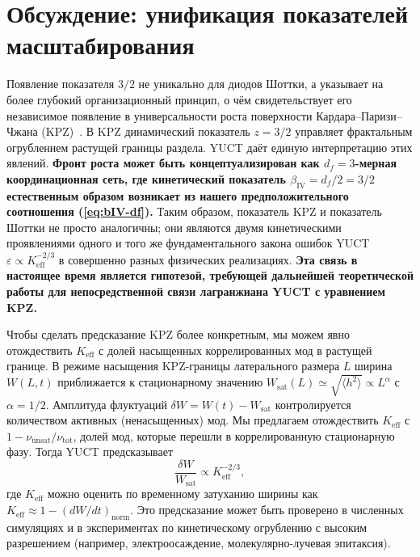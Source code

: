 \documentclass[12pt,a4paper]{article}
\newcommand{\Keff}{K_{\mathrm{eff}}}
\begin{document}
	\section{Обсуждение: унификация показателей масштабирования}
	
	Появление показателя $3/2$ не уникально для диодов Шоттки, а указывает на
	более глубокий организационный принцип, о чём свидетельствует его
	независимое появление в универсальности роста поверхности Кардара–Паризи–Чжана
	(KPZ)~\cite{KPZ}. В KPZ динамический показатель $z = 3/2$ управляет
	фрактальным огрублением растущей границы раздела. YUCT даёт единую
	интерпретацию этих явлений. \textbf{Фронт роста может быть концептуализирован
		как $d_f = 3$-мерная координационная сеть, где кинетический показатель
		$\beta_{\mathrm{IV}} = d_f/2 = 3/2$ естественным образом возникает из
		нашего предположительного соотношения (\ref{eq:bIV-df}).}
	Таким образом, показатель KPZ и показатель Шоттки не просто аналогичны;
	они являются двумя кинетическими проявлениями одного и того же
	фундаментального закона ошибок YUCT $\varepsilon \propto \Keff^{-2/3}$ в
	совершенно разных физических реализациях. \textbf{Эта связь в настоящее
		время является гипотезой, требующей дальнейшей теоретической работы для
		непосредственной связи лагранжиана YUCT с уравнением KPZ.}
	
	Чтобы сделать предсказание KPZ более конкретным, мы можем явно
	отождествить $\Keff$ с долей насыщенных коррелированных мод в растущей
	границе. В режиме насыщения KPZ-границы латерального размера $L$ ширина
	$W(L,t)$ приближается к стационарному значению $W_{\text{sat}}(L) \simeq
	\sqrt{\langle h^2 \rangle} \propto L^{\alpha}$ с $\alpha = 1/2$.
	Амплитуда флуктуаций $\delta W = W(t) - W_{\text{sat}}$ контролируется
	количеством активных (ненасыщенных) мод. Мы предлагаем отождествить
	$\Keff$ с $1 - \nu_{\text{unsat}}/\nu_{\text{tot}}$, долей мод, которые
	перешли в коррелированную стационарную фазу. Тогда YUCT предсказывает
	\begin{equation}
		\frac{\delta W}{W_{\text{sat}}} \propto \Keff^{-2/3},
		\label{eq:kpz-prediction}
	\end{equation}
	где $\Keff$ можно оценить по временному затуханию ширины как
	$\Keff \approx 1 - (dW/dt)_{\text{norm}}$. Это предсказание может быть
	проверено в численных симуляциях и в экспериментах по кинетическому
	огрублению с высоким разрешением (например, электроосаждение,
	молекулярно-лучевая эпитаксия).
	
\end{document}
